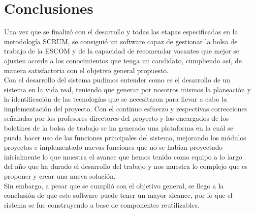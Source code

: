 \clearpage
\section{Conclusiones}
Una vez que se finalizó con el desarrollo y todas las etapas especificadas en la metodología SCRUM, se consiguió un software capaz de gestionar la bolsa de trabajo de la ESCOM y de la capacidad de recomendar vacantes que mejor se ajusten acorde a los conocimientos que tenga un candidato, cumpliendo así, de manera satisfactoria con el objetivo general propuesto.\\
\newline
Con el desarrollo del sistema pudimos entender como es el desarrollo de un sistema en la vida real, teniendo que generar por nosotros mismos la planeación y la identificación de las tecnologías que se necesitaron para llevar a cabo la implementación del proyecto. Con el continuo esfuerzo y respectivas correcciones señaladas por los profesores directores del proyecto y los encargados de los boletines de la bolsa de trabajo se ha generado una plataforma en la cuál se pueda hacer uso de las funciones principales del sistema, mejorando los módulos proyectas e implementado nuevas funciones que no se habían proyectado inicialmente lo que muestra el avance que hemos tenido como equipo a lo largo del año que ha durado el desarrollo del trabajo y nos muestra lo complejo que es proponer y crear una nueva solución.\\
\newline
Sin embargo, a pesar que se cumplió con el objetivo general, se llego a la conclusión de que este software puede tener un mayor alcance, por lo que el sistema se fue construyendo a base de componentes reutilizables.




